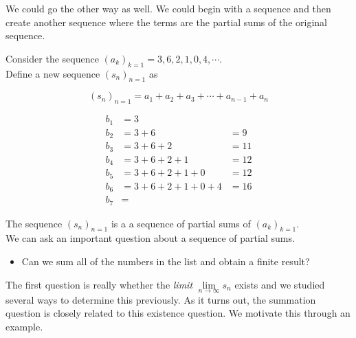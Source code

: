 \documentclass{ximera}
\begin{document}
We could go the other way as well.  We could begin with a sequence and then create another sequence where the terms are the partial sums of the original sequence.








\begin{example}


Consider the sequence $(a_k)_{k=1} = 3, 6, 2, 1, 0, 4, \cdots$. \\

Define a new sequence $(s_n)_{n=1}$ as 


\[
(s_n)_{n=1} = a_1 + a_2 + a_3 + \cdots + a_{n-1} + a_n
\]





\begin{align*}
b_1 & = 3 \\
b_2 & = 3 + 6 & = 9 \\
b_3 & = 3 + 6 + 2 & = 11 \\
b_4 & = 3 + 6 + 2 + 1 & = 12 \\
b_5 & = 3 + 6 + 2 + 1 + 0 & = 12 \\
b_6 & = 3 + 6 + 2 + 1 + 0 + 4 & = 16 \\
b_7 & = 
\end{align*}



\end{example}


The sequence $(s_n)_{n=1}$ is a a sequence of partial sums of $(a_k)_{k=1}$. \\




We can ask an important question about a sequence of partial sums.

\begin{itemize}
\item Can we sum all of the numbers in the list and obtain a finite result?
\end{itemize}





The first question is really whether the \emph{limit} $\lim\limits_{n \to \infty} s_n$ exists and we studied several ways to determine this previously.  As it turns out, the summation question is closely related to this existence question.  We motivate this through an example.
\end{document}
